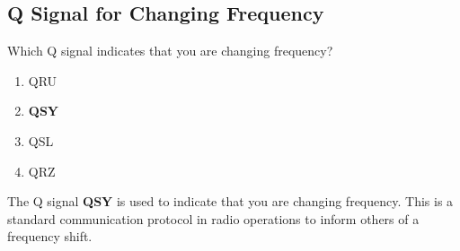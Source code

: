 \subsection{Q Signal for Changing Frequency}
\label{T2B11}

\begin{tcolorbox}[colback=gray!10!white,colframe=black!75!black,title=T2B11]
Which Q signal indicates that you are changing frequency?
\begin{enumerate}[noitemsep]
    \item QRU
    \item \textbf{QSY}
    \item QSL
    \item QRZ
\end{enumerate}
\end{tcolorbox}

The Q signal \textbf{QSY} is used to indicate that you are changing frequency. This is a standard communication protocol in radio operations to inform others of a frequency shift.